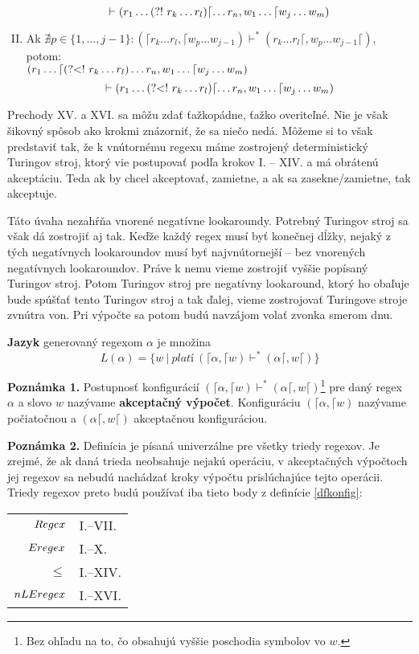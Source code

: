 \begin{df}
\begin{enumerate}[I.]
$$\vdash (r_1\dots \text{(?!~} r_{k}\dots r_{l} ) \lceil\dots r_n, w_1\dots \lceil w_j \dots w_m)$$
\item Ak $\nexists p \in \lbrace 1,\dots,j-1\rbrace: (\lceil r_k\dots r_l,\lceil w_p\dots w_{j-1}) \vdash^* (r_k\dots r_l\lceil, w_p \dots w_{j-1} \lceil)$, potom:
\\$\displaystyle{(r_1\dots\lceil \text{(?\textless !~}r_{k}\dots r_{l} ) \dots r_n, w_1\dots \lceil w_j \dots w_m)}$
$$\vdash (r_1\dots \text{(?\textless !~} r_{k}\dots r_{l} ) \lceil\dots r_n, w_1\dots \lceil w_j \dots w_m)$$
\end{enumerate}

\end{df}

Prechody XV. a XVI. sa môžu zdať ťažkopádne, ťažko overiteľné. Nie je však šikovný spôsob ako krokmi znázorniť, že sa niečo nedá. Môžeme si to však predstaviť tak, že k vnútornému regexu máme zostrojený deterministický Turingov stroj, ktorý vie postupovať podľa krokov I. -- XIV. a má obrátenú akceptáciu. Teda ak by chcel akceptovať, zamietne, a ak sa zasekne/zamietne, tak akceptuje.

Táto úvaha nezahŕňa vnorené negatívne lookaroundy. Potrebný Turingov stroj sa však dá zostrojiť aj tak. Keďže každý regex musí byť konečnej dĺžky, nejaký z tých negatívnych lookaroundov musí byť najvnútornejší -- bez vnorených negatívnych look\-aroundov. Práve k nemu vieme zostrojiť vyššie popísaný Turingov stroj. Potom Turingov stroj pre negatívny lookaround, ktorý ho obaľuje bude spúšťať tento Turingov stroj a tak ďalej, vieme zostrojovať Turingove stroje zvnútra von. Pri výpočte sa potom budú navzájom volať zvonka smerom dnu.

\begin{df}
\textbf{Jazyk} generovaný regexom $\alpha$ je množina $$L(\alpha) = \lbrace w~|~platí ~ (\lceil \alpha, \lceil w)\vdash^* (\alpha\lceil, w\lceil) \rbrace$$
\end{df}

\textbf{Poznámka 1.}
Postupnosť konfigurácií $(\lceil \alpha, \lceil w)\vdash^* (\alpha\lceil, w\lceil)$\footnote{Bez ohľadu na to, čo obsahujú vyššie poschodia symbolov vo $w$.} pre daný regex $\alpha$ a slovo $w$ nazývame \textbf{akceptačný výpočet}. Konfiguráciu $(\lceil \alpha,\lceil w)$ nazývame počiatočnou a $(\alpha\lceil,w\lceil)$ akceptačnou konfiguráciou.

\textbf{Poznámka 2.}
Definícia je písaná univerzálne pre všetky triedy regexov. Je zrejmé, že ak daná trieda neobsahuje nejakú operáciu, v akceptačných výpočtoch jej regexov sa nebudú nachádzať kroky výpočtu prislúchajúce tejto operácii. Triedy regexov preto budú používať iba tieto body z definície \ref{dfkonfig}:
\begin{center}
\begin{tabular}{r|l}
$Regex$ & I.--VII. \\
$Eregex$ & I.--X. \\
$\le$ & I.--XIV. \\
$nLEregex$ & I.--XVI.
\end{tabular}
\end{center}


